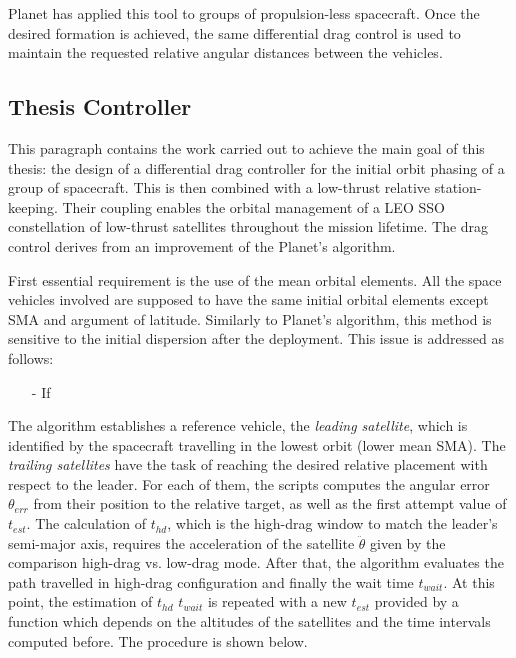 Planet has applied this tool to groups of propulsion-less spacecraft.
Once the desired formation is achieved, the same differential drag control is used to maintain the requested relative angular distances between the vehicles.



\subsection{Thesis Controller}
This paragraph contains the work carried out to achieve the main goal of this thesis: the design of a differential drag controller for the initial orbit phasing of a group of spacecraft.
This is then combined with a low-thrust relative station-keeping.
Their coupling enables the orbital management of a LEO SSO constellation of low-thrust satellites throughout the mission lifetime. 
The drag control derives from an improvement of the Planet's algorithm.

First essential requirement is the use of the mean orbital elements.
All the space vehicles involved are supposed to have the same initial orbital elements except SMA and argument of latitude.  
Similarly to Planet's algorithm, this method is sensitive to the initial dispersion after the deployment.
This issue is addressed as follows:

\begin{itemize}
      \item[-] If 
      
\end{itemize}

The algorithm establishes a reference vehicle, the \textit{leading satellite}, which is identified by the spacecraft travelling in the lowest orbit (lower mean SMA).
The \textit{trailing satellites} have the task of reaching the desired relative placement with respect to the leader.
For each of them, the scripts computes the angular error $\theta_{err}$ from their position to the relative target, as well as the first attempt value of $t_{est}$.
The calculation of $t_{hd}$, which is the high-drag window to match the leader's semi-major axis, requires the acceleration of the satellite $\ddot{\theta}$ given by the comparison high-drag vs. low-drag mode.
After that, the algorithm evaluates the path travelled in high-drag configuration and finally the wait time $t_{wait}.$ 
At this point, the estimation of $t_{hd}$ $t_{wait}$ is repeated with a new $t_{est}$ provided by a function which depends on the altitudes of the satellites and the time intervals computed before.
The procedure is shown below.

